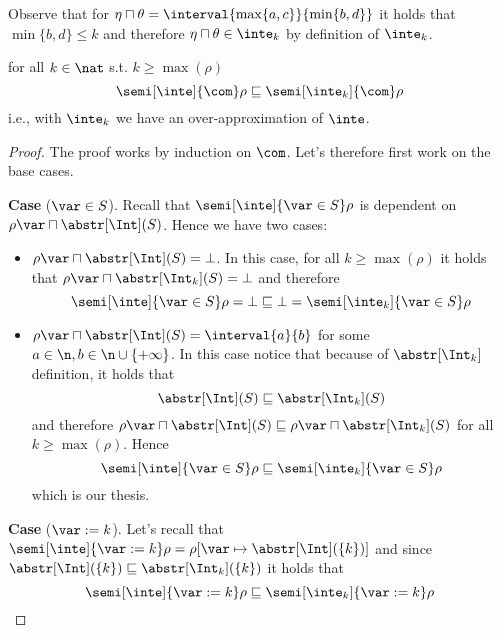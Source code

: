 Observe that for
\({\eta \sqcap \theta = \interval{\max\{a,c\}}{\min\{b,d\}}}\) it
holds that \({\min\{b,d\} \leq k}\) and therefore
\({\eta \sqcap \theta \in \inte_k}\) by definition of \(\inte_k\).
\begin{lemma}\label{le:subs}
  for all \(k\in\nat\) s.t. \(k \geq \max(\rho)\)
  \begin{equation*}
    \semi[\inte]{\com}\rho \sqsubseteq \semi[\inte_k]{\com}\rho
  \end{equation*}
  i.e., with \(\inte_k\) we have an over-approximation of \(\inte\).
\end{lemma}
\begin{proof}
  The proof works by induction on \(\com\). Let's therefore first work
  on the base cases.

  \medskip

  \noindent
  \textbf{Case} (\(\var \in S\)).
  Recall that \(\semi[\inte]{\var\in S}\rho\) is dependent on
  \({\rho\var \sqcap \abstr[\Int](S)}\). Hence we have two cases:
  \begin{itemize}
  \item \({\rho\var \sqcap \abstr[\Int](S)} = \bot\). In this case, for
    all \(k\geq \max(\rho)\) it holds that
    \({\rho\var \sqcap \abstr[\Int_k](S)} = \bot\) and therefore
    \begin{equation*}
      \semi[\inte]{\var\in S}\rho = \bot \sqsubseteq \bot = \semi[\inte_k]{\var\in S}\rho
    \end{equation*}
    
  \item \({\rho\var \sqcap \abstr[\Int](S)} = \interval{a}{b}\) for some
    \({a \in \n}, {b \in \n\cup\{+\infty\}}\). In this case notice that
    because of \(\abstr[\Int_k]\) definition, it holds that
    \begin{equation*}
      \abstr[\Int](S) \sqsubseteq \abstr[\Int_k](S)
    \end{equation*}
    and therefore
    \({\rho\var \sqcap \abstr[\Int](S)} \sqsubseteq {\rho\var \sqcap
      \abstr[\Int_k](S)}\) for all \(k \geq \max(\rho)\). Hence
    \begin{equation*}
      {\semi[\inte]{\var\in S}\rho} \sqsubseteq {\semi[\inte_k]{\var\in S}\rho}
    \end{equation*}
    which is our thesis.
  \end{itemize}

  \medskip

  \noindent
  \textbf{Case} (\(\var := k\)).
  Let's recall that
  \({\semi[\inte]{\var := k}\rho = \rho[\var \mapsto
    \abstr[\Int](\{k\})]}\) and since
  \({\abstr[\Int](\{k\})} \sqsubseteq {\abstr[\Int_k](\{k\})}\) it holds
  that
  \begin{equation*}
    \semi[\inte]{\var := k}\rho \sqsubseteq \semi[\inte_k]{\var := k}\rho
  \end{equation*}


\end{proof}

